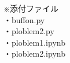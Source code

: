 \documentclass[a4paper,dvipdfmx]{jarticle}
\begin{document}


\newpage
\noindent
※添付ファイル \\
・buffon.py \\
・ploblem2.py \\
・ploblem1.ipynb \\
・ploblem2.ipynb
\end{document}
